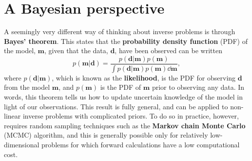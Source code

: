\section*{A Bayesian perspective}
A seemingly very different way of thinking about inverse problems is through \textbf{Bayes' theorem}. This states that 
 the \textbf{probability density function} (PDF) of the model, $\mathbf{m}$, given that
the data, $\mathbf{d}$, have been observed can be written
\begin{equation}
    p(\mathbf{m}|\mathbf{d}) = \frac{ p(\mathbf{d}|\mathbf{m}) p(\mathbf{m})}{\int p(\mathbf{d}|\mathbf{m}) p(\mathbf{m}) \dd \mathbf{m}}, 
    \label{eq:37}
\end{equation}
where $p(\mathbf{d}|\mathbf{m})$, which is known as the \textbf{likelihood}, is the PDF for observing $\mathbf{d}$ from the model $\mathbf{m}$, 
and $p(\mathbf{m})$ is the PDF of $\mathbf{m}$ prior to observing any data. In words, this theorem tells us how to update uncertain 
knowledge of the model in light of our observations. This result is fully general, and can be applied to non-linear inverse problems 
with complicated priors. To do so in practice, however, requires random sampling techniques such as the \textbf{Markov chain Monte Carlo} (MCMC) 
algorithm, and this is generally possible only for relatively low-dimensional problems for which forward calculations have a 
low computational cost.

